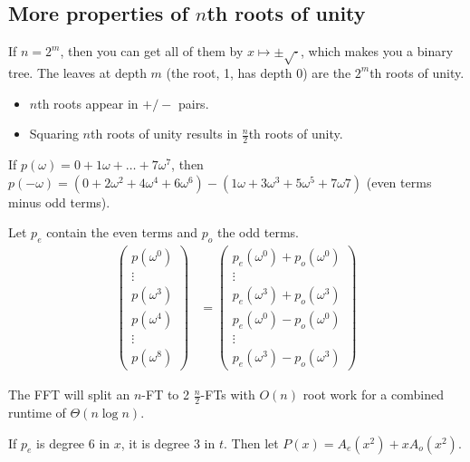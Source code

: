 \subsection{More properties of \(n\)th roots of unity}
If \(n = 2^m\), then you can get all of them by \(x \mapsto \pm\sqrt{\cdot}\), which makes you a binary tree. The leaves at depth \(m\) (the root, 1, has depth 0) are the \(2^m\)th roots of unity.

\begin{itemize}
	\item \(n\)th roots appear in \(+/-\) pairs.
	\item Squaring \(n\)th roots of unity results in \(\frac{n}{2}\)th roots of unity.
\end{itemize}

If \(p(\omega) = 0 + 1\omega + \ldots + 7\omega^7\), then \(p(-\omega) = \left(0 + 2\omega^2 + 4\omega^4 + 6 \omega^6\right) - \left(1\omega + 3\omega^3 + 5\omega^5 + 7\omega7\right)\) (even terms minus odd terms).

Let \(p_e\) contain the even terms and \(p_o\) the odd terms.
\begin{align}
	\begin{pmatrix}
		p(\omega^0)\\
		\vdots\\
		p(\omega^3)\\
		p(\omega^4)\\
		\vdots\\
		p(\omega^8)
	\end{pmatrix}
	&=
	\begin{pmatrix}
		p_e(\omega^0) + p_o(\omega^0) \\
		\vdots \\
		p_e(\omega^3) + p_o(\omega^3) \\
		p_e(\omega^0) - p_o(\omega^0) \\
		\vdots \\
		p_e(\omega^3) - p_o(\omega^3)
	\end{pmatrix}
\end{align}

The FFT will split an \(n\)-FT to 2 \(\frac{n}{2}\)-FTs with \(O(n)\) root work for a combined runtime of \(\Theta(n\log n)\).

If \(p_e\) is degree 6 in \(x\), it is degree 3 in \(t\). Then let \(P(x) = A_e\left(x^2\right) + xA_o\left(x^2\right)\).

